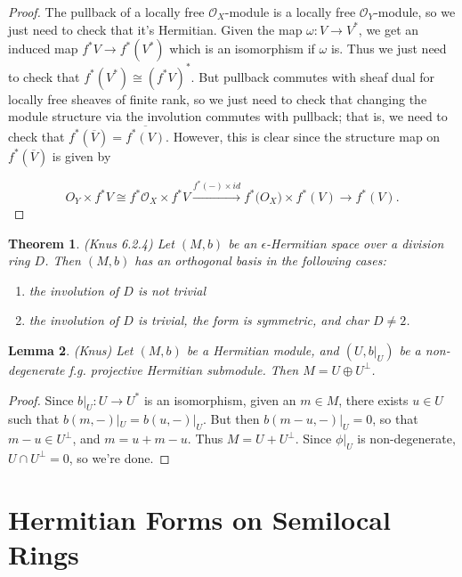 \documentclass[edeposit,fullpage]{uiucthesis2009}
\newcommand{\mc}{\mathcal}
\theoremstyle{plain}
\newtheorem{lemma}{Lemma}
\numberwithin{lemma}{section}
\newtheorem{theorem}[lemma]{Theorem}
\theoremstyle{definition}
\begin{document}
\begin{proof}
The pullback of a locally free $\mc O_X$-module is a locally free $\mc
O_Y$-module, so we just need to check that it's Hermitian. Given the
map $\omega : V \rightarrow V^*$, we get an induced map $f^*V
\rightarrow f^*(V^*)$ which is an isomorphism if $\omega$ is. Thus we
just need to check that $f^*(V^*) \cong (f^*V)^*$. But pullback
commutes with sheaf dual for locally free sheaves of finite rank, so
we just need to check that changing the module structure via the
involution commutes with pullback; that is, we need to check that
$f^*(\overline V) = \overline{f^*(V)}$. However, this is clear since
the structure map on $f^*(\overline V)$ is given by

\[
O_Y \times f^*V \cong f^* \mc O_X \times f^*V \xrightarrow{f^*(-) \times id} f^*\mc(O_X) \times f^*(V)
\rightarrow f^*(V).
\]
\end{proof}

\begin{theorem} (Knus \cite{HermKnus} 6.2.4)
Let $(M,b)$ be an $\epsilon$-Hermitian space over a division ring
$D$. Then $(M,b)$ has an orthogonal basis in the following cases:
\begin{enumerate}
\item the involution of $D$ is not trivial
\item the involution of $D$ is trivial, the form is symmetric, and
  char $D \neq 2$.
\end{enumerate}
\end{theorem}

\begin{lemma} (Knus)
Let $(M,b)$ be a Hermitian module, and $(U,b|_U)$ be a non-degenerate
f.g. projective Hermitian submodule. Then $M = U \oplus U^\perp$.
\end{lemma}

\begin{proof}
Since $b|_U : U \rightarrow U^*$ is an isomorphism, given an $m \in
M$, there exists $u \in U$ such that $b(m,-)|_U = b(u,-)|_U$. But then
$b(m-u,-)|_U = 0$, so that $m-u \in U^\perp$, and $m = u + m-u$. Thus
$M = U + U^\perp$. Since $\phi|_U$ is non-degenerate, $U \cap U^\perp
= 0$, so we're done. 
\end{proof}

\section{Hermitian Forms on Semilocal Rings}\label{sec:herm_form_semiloc}
\end{document}
